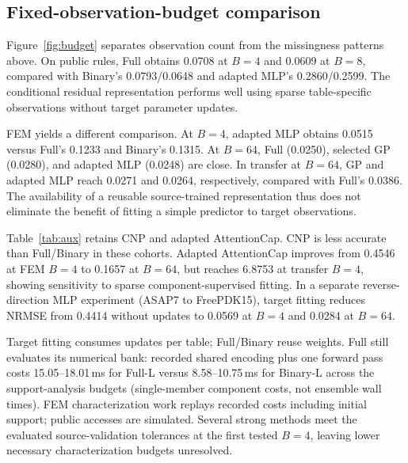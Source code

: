 \documentclass[conference,10pt,letterpaper]{IEEEtran}
\begin{document}
\subsection{Fixed-observation-budget comparison}

Figure~\ref{fig:budget} separates observation count from the missingness patterns above. On public rules, Full obtains 0.0708 at $B=4$ and 0.0609 at $B=8$, compared with Binary's 0.0793/0.0648 and adapted MLP's 0.2860/0.2599. The conditional residual representation performs well using sparse table-specific observations without target parameter updates.

FEM yields a different comparison. At $B=4$, adapted MLP obtains 0.0515 versus Full's 0.1233 and Binary's 0.1315. At $B=64$, Full (0.0250), selected GP (0.0280), and adapted MLP (0.0248) are close. In transfer at $B=64$, GP and adapted MLP reach 0.0271 and 0.0264, respectively, compared with Full's 0.0386. The availability of a reusable source-trained representation thus does not eliminate the benefit of fitting a simple predictor to target observations.

\begin{table}[t]
\centering\caption{Additional fixed-budget controls, pooled-replicate macro NRMSE. AC denotes component-supervised adapted AttentionCap. Dashes mark unavailable or infeasible evaluations. These AC results evaluate the stated rule-completion adaptation, rather than rank the original capacitance-matrix task.}
\label{tab:aux}\small\setlength{\tabcolsep}{2pt}
\end{table}
Table~\ref{tab:aux} retains CNP and adapted AttentionCap. CNP is less accurate than Full/Binary in these cohorts. Adapted AttentionCap improves from 0.4546 at FEM $B=4$ to 0.1657 at $B=64$, but reaches 6.8753 at transfer $B=4$, showing sensitivity to sparse component-supervised fitting. In a separate reverse-direction MLP experiment (ASAP7 to FreePDK15), target fitting reduces NRMSE from 0.4414 without updates to 0.0569 at $B=4$ and 0.0284 at $B=64$.

Target fitting consumes updates per table; Full/Binary reuse weights. Full still evaluates its numerical bank: recorded shared encoding plus one forward pass costs 15.05--18.01\,ms for Full-L versus 8.58--10.75\,ms for Binary-L across the support-analysis budgets (single-member component costs, not ensemble wall times). FEM characterization work replays recorded costs including initial support; public accesses are simulated. Several strong methods meet the evaluated source-validation tolerances at the first tested $B=4$, leaving lower necessary characterization budgets unresolved.
\end{document}

